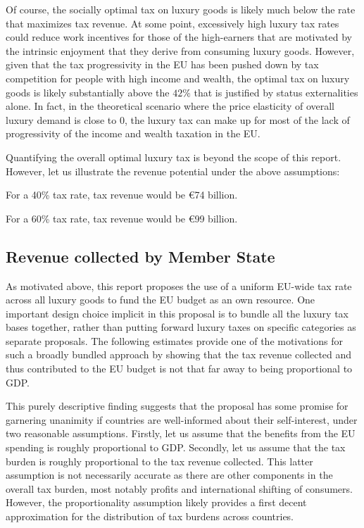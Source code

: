 \documentclass{article}
\begin{document}
Of course, the socially optimal tax on luxury goods is likely much below the rate that maximizes tax revenue. At some point, excessively high luxury tax rates could reduce work incentives for those of the high-earners that are motivated by the intrinsic enjoyment that they derive from consuming luxury goods. However, given that the tax progressivity in the EU has been pushed down by tax competition for people with high income and wealth, the optimal tax on luxury goods is likely substantially above the $42\%$ that is justified by status externalities alone. In fact, in the theoretical scenario where the price elasticity of overall luxury demand is close to 0, the luxury tax can make up for most of the lack of progressivity of the income and wealth taxation in the EU. 

Quantifying the overall optimal luxury tax is beyond the scope of this report. However, let us illustrate the revenue potential under the above assumptions:

For a 40\% tax rate, %
tax revenue would be \euro{}74 billion. 

For a 60\% tax rate, 
tax revenue would be \euro{}99 billion. 

\subsection{Revenue collected by Member State } \label{tax revenue estimates by eu member states}

As motivated above, this report proposes the use of a uniform EU-wide tax rate across all luxury goods to fund the EU budget as an own resource. One important design choice implicit in this proposal is to bundle all the luxury tax bases together, rather than putting forward luxury taxes on specific categories as separate proposals. The following estimates provide one of the motivations for such a broadly bundled approach by showing that the tax revenue collected and thus contributed to the EU budget is not that far away to being proportional to GDP.

This purely descriptive finding suggests that the proposal has some promise for garnering unanimity if countries are well-informed about their self-interest, under two reasonable assumptions. Firstly, let us assume that the benefits from the EU spending is roughly proportional to GDP. %
Secondly, let us assume that the tax burden is roughly proportional to the tax revenue collected. This latter assumption is not necessarily accurate as there are other components in the overall tax burden, most notably profits and international shifting of consumers. However, the proportionality assumption likely provides a first decent approximation for the 
distribution of tax burdens across countries. %
\end{document}
